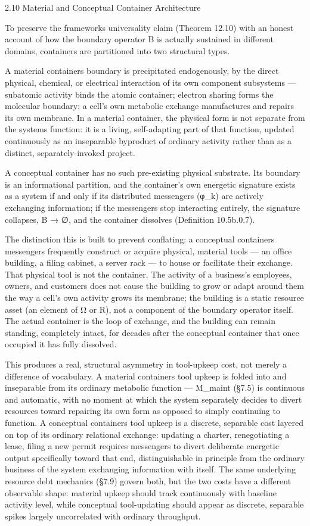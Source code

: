 \documentclass[
]{article}
\begin{document}
2.10 Material and Conceptual Container Architecture

To preserve the frameworks universality claim (Theorem 12.10) with an
honest account of how the boundary operator B is actually sustained in
different domains, containers are partitioned into two structural types.

A material containers boundary is precipitated endogenously, by the
direct physical, chemical, or electrical interaction of its own
component subsystems --- subatomic activity binds the atomic container;
electron sharing forms the molecular boundary; a cell's own metabolic
exchange manufactures and repairs its own membrane. In a material
container, the physical form is not separate from the systems function:
it is a living, self-adapting part of that function, updated
continuously as an inseparable byproduct of ordinary activity rather
than as a distinct, separately-invoked project.

A conceptual container has no such pre-existing physical substrate. Its
boundary is an informational partition, and the container's own
energetic signature exists as a system if and only if its distributed
messengers (φ\_k) are actively exchanging information; if the messengers
stop interacting entirely, the signature collapses, B → ∅, and the
container dissolves (Definition 10.5b.0.7).

The distinction this is built to prevent conflating: a conceptual
containers messengers frequently construct or acquire physical, material
tools --- an office building, a filing cabinet, a server rack --- to
house or facilitate their exchange. That physical tool is not the
container. The activity of a business's employees, owners, and customers
does not cause the building to grow or adapt around them the way a
cell's own activity grows its membrane; the building is a static
resource asset (an element of Ω or R), not a component of the boundary
operator itself. The actual container is the loop of exchange, and the
building can remain standing, completely intact, for decades after the
conceptual container that once occupied it has fully dissolved.

This produces a real, structural asymmetry in tool-upkeep cost, not
merely a difference of vocabulary. A material containers tool upkeep is
folded into and inseparable from its ordinary metabolic function ---
M\_maint (§7.5) is continuous and automatic, with no moment at which the
system separately decides to divert resources toward repairing its own
form as opposed to simply continuing to function. A conceptual
containers tool upkeep is a discrete, separable cost layered on top of
its ordinary relational exchange: updating a charter, renegotiating a
lease, filing a new permit requires messengers to divert deliberate
energetic output specifically toward that end, distinguishable in
principle from the ordinary business of the system exchanging
information with itself. The same underlying resource debt mechanics
(§7.9) govern both, but the two costs have a different observable shape:
material upkeep should track continuously with baseline activity level,
while conceptual tool-updating should appear as discrete, separable
spikes largely uncorrelated with ordinary throughput.
\end{document}

